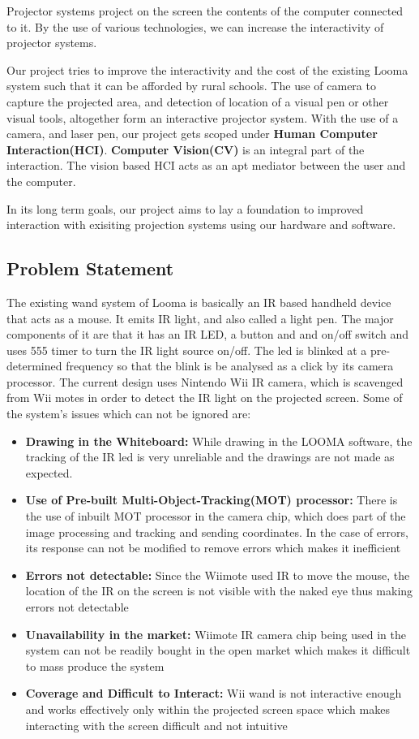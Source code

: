 \documentclass[12pt, a4paper]{article}
\begin{document}
Projector systems project on the screen the contents of the computer connected to it. By the use of various technologies, we can increase the interactivity of projector systems. 

Our project tries to improve the interactivity and the cost of the existing Looma system such that it can be afforded by rural schools. The use of camera to capture the projected area, and detection of location of a visual pen or other visual tools, altogether form an interactive projector system. With the use of a camera, and laser pen, our project gets scoped under \textbf{Human Computer Interaction(HCI)}. \textbf{Computer Vision(CV)} is an integral part of the interaction. The vision based HCI acts as an apt mediator between the user and the computer.

In its long term goals, our project aims to lay a foundation to improved interaction with exisiting projection systems using our hardware and software. 

\subsection{Problem Statement}
The existing wand system of Looma is basically an IR based handheld device that acts as a mouse. It emits IR light, and also called a light pen. The major components of it are that it has an IR LED, a button and and on/off switch and uses 555 timer to turn the IR light source on/off. The led is blinked at a pre-determined frequency so that the blink is be analysed as a click by its camera processor. The current design uses Nintendo Wii IR camera, which is scavenged from Wii motes in order to detect the IR light on the projected screen. Some of the system's issues which can not be ignored are:

\begin{itemize}
\item \textbf {Drawing in the Whiteboard:} While drawing in the LOOMA software, the tracking of the IR led is very unreliable and the drawings are not made as expected.
\item \textbf{Use of Pre-built Multi-Object-Tracking(MOT) processor:} There is the use of inbuilt MOT processor in the camera chip, which does part of the image processing and tracking and sending coordinates. In the case of errors, its response can not be modified to remove errors which makes it inefficient
\item \textbf{Errors not detectable:} Since the Wiimote used IR to move the mouse, the location of the IR on the screen is not visible with the naked eye thus making errors not detectable 
\item \textbf{Unavailability in the market:} Wiimote IR camera chip being used in the system can not be readily bought in the open market which makes it difficult to mass produce the system
\item \textbf{Coverage and Difficult to Interact:} Wii wand is not interactive enough and works effectively only within the projected screen space which makes interacting with the screen difficult and not intuitive
\end{itemize}
\end{document}
